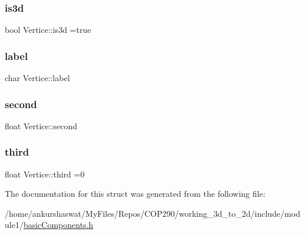 \subsubsection{\texorpdfstring{is3d}{is3d}}
{\footnotesize\ttfamily bool Vertice\+::is3d =true}

\mbox{\label{structVertice_a0181015506ba076b22502bba2c02f4cf}} 
\subsubsection{\texorpdfstring{label}{label}}
{\footnotesize\ttfamily char Vertice\+::label}

\mbox{\label{structVertice_a3b09ccd0c9d23978cb17ebe303b498a2}} 
\subsubsection{\texorpdfstring{second}{second}}
{\footnotesize\ttfamily float Vertice\+::second}

\mbox{\label{structVertice_a781306a1aba368740f76928fc4b3b6bc}} 
\subsubsection{\texorpdfstring{third}{third}}
{\footnotesize\ttfamily float Vertice\+::third =0}



The documentation for this struct was generated from the following file\+:\begin{DoxyCompactItemize}
\item 
/home/ankurshaswat/\+My\+Files/\+Repos/\+C\+O\+P290/working\+\_\+3d\+\_\+to\+\_\+2d/include/module1/\hyperlink{basicComponents_8h}{basic\+Components.\+h}\end{DoxyCompactItemize}
